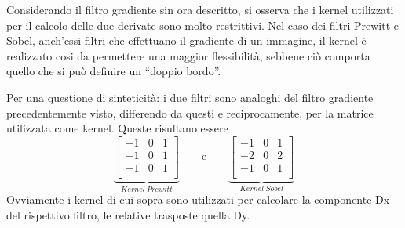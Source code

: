 \documentclass{subfiles}
\begin{document}
Considerando il filtro gradiente sin ora descritto, si osserva che i kernel utilizzati per il calcolo delle due derivate sono molto restrittivi.
Nel caso dei filtri Prewitt e Sobel, anch'essi filtri che effettuano il gradiente di un immagine, il kernel è realizzato cosi da permettere una maggior flessibilità,
sebbene ciò comporta quello che si può definire un ``doppio bordo''.

Per una questione di sinteticità: i due filtri sono analoghi del filtro gradiente precedentemente visto, differendo da questi e reciprocamente,
per la matrice utilizzata come kernel. Queste risultano essere
\[\underbrace{\begin{bmatrix}
            -1 & 0 & 1 \\
            -1 & 0 & 1 \\
            -1 & 0 & 1 \\
        \end{bmatrix}}_{Kernel \ Prewitt} \qquad \text{e} \qquad \underbrace{\begin{bmatrix}
            -1 & 0 & 1 \\
            -2 & 0 & 2 \\
            -1 & 0 & 1 \\
        \end{bmatrix}}_{Kernel \ Sobel}\]
Ovviamente i kernel di cui sopra sono utilizzati per calcolare la componente Dx del rispettivo filtro, le relative trasposte quella Dy.
\end{document}
